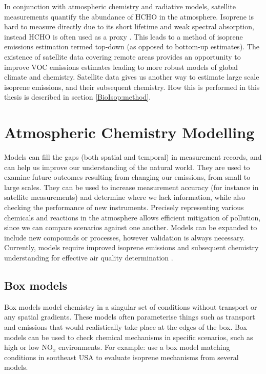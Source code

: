       In conjunction with atmospheric chemistry and radiative models, satellite measurements quantify the abundance of HCHO in the atmosphere.
      Isoprene is hard to measure directly due to its short lifetime and weak spectral absorption, instead HCHO is often used as a proxy \parencite{Millet2006, Fu2007, Dufour2009, Marais2012, bauwens2013satellite, Kefauver2014, Bauwens2016, Surl2018}.
      This leads to a method of isoprene emissions estimation termed top-down (as opposed to bottom-up estimates).
      The existence of satellite data covering remote areas provides an opportunity to improve VOC emissions estimates leading to more robust models of global climate and chemistry. 
      Satellite data gives us another way to estimate large scale isoprene emissions, and their subsequent chemistry.
      How this is performed in this thesis is described in section \ref{BioIsop:method}.
  
\section{Atmospheric Chemistry Modelling}
\label{LR:Models}
  
  Models can fill the gaps (both spatial and temporal) in measurement records, and can help us improve our understanding of the natural world.
  They are used to examine future outcomes resulting from changing our emissions, from small to large scales.
  They can be used to increase measurement accuracy (for instance in satellite measurements) and determine where we lack information, while also checking the performance of new instruments.
  Precisely representing various chemicals and reactions in the atmosphere allows efficient mitigation of pollution, since we can compare scenarios against one another.
  Models can be expanded to include new compounds or processes, however validation is always necessary.
  Currently, models require improved isoprene emissions and subsequent chemistry understanding for effective air quality determination \parencite{Marvin2017}.
  
  
  \subsection{Box models}
    
    Box models model chemistry in a singular set of conditions without transport or any spatial gradients.
    These models often parameterise things such as transport and emissions that would realistically take place at the edges of the box.
    Box models can be used to check chemical mechanisms in specific scenarios, such as high or low NO$_x$ environments.
    For example: \textcite{Marvin2017} use a box model matching conditions in southeast USA to evaluate isoprene mechanisms from several models.  
    
